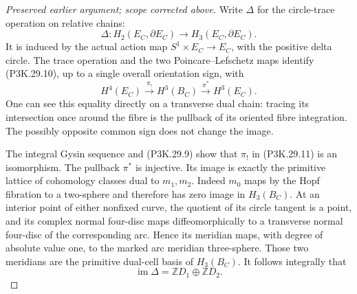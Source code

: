 \begin{proof}[Preserved earlier argument; scope corrected above]
Write \(\Delta\) for the circle-trace operation on relative
chains:
\[
 \Delta:H_2(E_C,\partial E_C)\longrightarrow
          H_3(E_C,\partial E_C).
                                                        \tag{P3K.29.10}
\]
It is induced by the actual action map
\(S^1\times E_C\to E_C\), with the positive delta circle.
The trace operation and the two Poincare--Lefschetz maps
identify (P3K.29.10), up to a single overall orientation
sign, with
\[
 H^4(E_C)\xrightarrow{\pi_!}H^3(B_C)
                    \xrightarrow{\pi^*}H^3(E_C).
                                                        \tag{P3K.29.11}
\]
One can see this equality directly on a transverse dual
chain: tracing its intersection once around the fibre is
the pullback of its oriented fibre integration. The
possibly opposite common sign does not change the image.

The integral Gysin sequence and (P3K.29.9) show that
\(\pi_!\) in (P3K.29.11) is an isomorphism. The pullback
\(\pi^*\) is injective. Its image is exactly the primitive
lattice of cohomology classes dual to \(m_1,m_2\).
Indeed \(m_0\) maps by the Hopf fibration to a two-sphere
and therefore has zero image in \(H_3(B_C)\). At an
interior point of either nonfixed curve, the quotient of
its circle tangent is a point, and its complex normal
four-disc maps diffeomorphically to a transverse normal
four-disc of the corresponding arc. Hence its meridian
maps, with degree of absolute value one, to the marked
arc meridian three-sphere. Those two meridians are the
primitive dual-cell basis of \(H_3(B_C)\). It follows
integrally that
\[
                       \operatorname{im}\Delta
                              =\mathbb ZD_1\oplus\mathbb ZD_2.
                                                        \tag{P3K.29.12}
\]


\end{proof}
